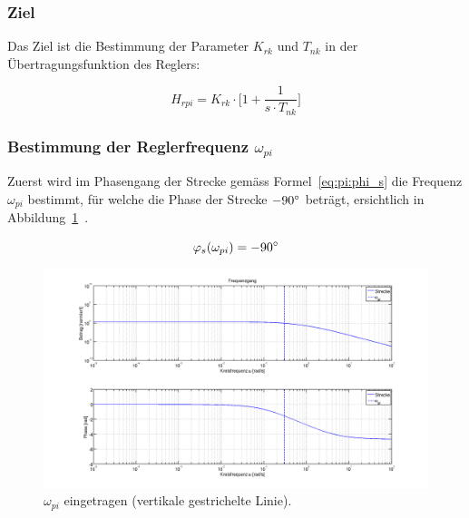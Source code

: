 \subsubsection*{Ziel}
Das  Ziel ist  die  Bestimmung  der Parameter  $K_{rk}$  und  $T_{nk}$ in  der
\"Ubertragungsfunktion des Reglers:

\begin{equation} \label{eq:pi:target}
    H_{rpi} = K_{rk} \cdot \biggl[ 1 + \frac{1}{s \cdot T_{nk}} \biggr]
\end{equation}


\subsubsection{Bestimmung der Reglerfrequenz $\omega_{pi}$}

Zuerst  wird  im  Phasengang  der  Strecke  gem\"ass  Formel~\ref{eq:pi:phi_s}
die     Frequenz     $\omega_{pi}$      bestimmt,     f\"ur     welche     die
Phase     der    Strecke     $-90\degree$     betr\"agt,    ersichtlich     in
Abbildung~\ref{fig:pi:omega_pi}~\footnotemark[4].

\begin{equation} \label{eq:pi:phi_s}
    \varphi_s(\omega_{pi}) = -90 \degree
\end{equation}


\begin{figure}[h! width=\pagewidth]
    \includegraphics[width=\textwidth]{images/piStreckeOmegaPI.png}
    \caption{%
        $\omega_{pi}$ eingetragen (vertikale gestrichelte Linie).
    }
    \label{fig:pi:omega_pi}
\end{figure}

